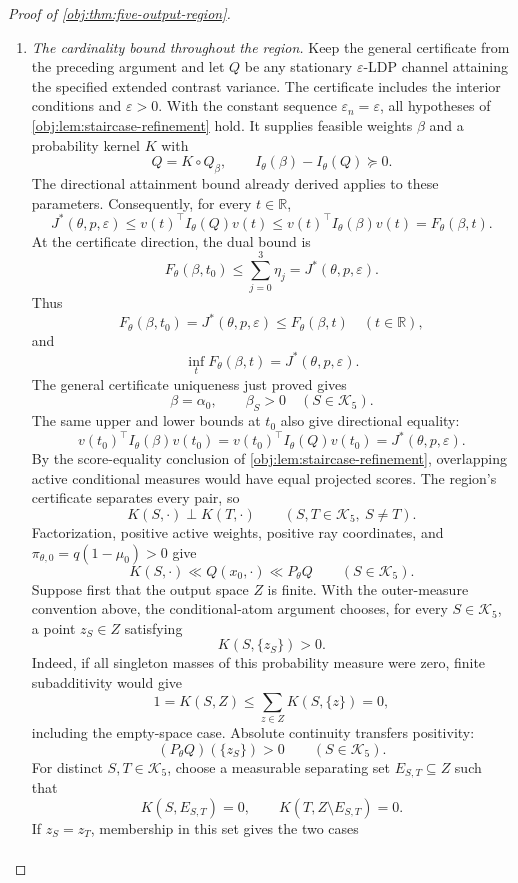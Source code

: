 \begin{proof}[Proof of \cref{obj:thm:five-output-region}]
\begin{enumerate}
\item \textit{The cardinality bound throughout the region.}
Keep the general certificate from the preceding argument and let \(Q\)
be any stationary \(\varepsilon\)-LDP channel attaining the specified
extended contrast variance. The certificate includes the interior
conditions and \(\varepsilon>0\). With the constant sequence
\(\varepsilon_n=\varepsilon\), all hypotheses of
\cref{obj:lem:staircase-refinement} hold. It supplies feasible weights
\(\beta\) and a probability kernel \(K\) with
\[
Q=K\circ Q_\beta,
\qquad
I_\theta(\beta)-I_\theta(Q)\succeq0.
\]
The directional attainment bound already derived applies to these
parameters. Consequently, for every \(t\in\mathbb R\),
\[
J^*(\theta,p,\varepsilon)
\le v(t)^\top I_\theta(Q)v(t)
\le v(t)^\top I_\theta(\beta)v(t)
=F_\theta(\beta,t).
\]
At the certificate direction, the dual bound is
\[
F_\theta(\beta,t_0)\le
\sum_{j=0}^3\eta_j
=
J^*(\theta,p,\varepsilon).
\]
Thus
\[
F_\theta(\beta,t_0)=J^*(\theta,p,\varepsilon)
\le F_\theta(\beta,t)\quad(t\in\mathbb R),
\]
and
\[
\inf_tF_\theta(\beta,t)=J^*(\theta,p,\varepsilon).
\]
The general certificate uniqueness just proved gives
\[
\beta=\alpha_0,\qquad \beta_S>0\quad(S\in\mathcal K_5).
\]
The same upper and lower bounds at \(t_0\) also give directional equality:
\[
v(t_0)^\top I_\theta(\beta)v(t_0)
=
v(t_0)^\top I_\theta(Q)v(t_0)
=
J^*(\theta,p,\varepsilon).
\]
By the score-equality conclusion of
\cref{obj:lem:staircase-refinement}, overlapping active conditional
measures would have equal projected scores. The region's certificate
separates every pair, so
\[
K(S,\cdot)\perp K(T,\cdot)
\qquad(S,T\in\mathcal K_5,\ S\ne T).
\]
Factorization, positive active weights, positive ray coordinates, and
\(\pi_{\theta,0}=q(1-\mu_0)>0\) give
\[
K(S,\cdot)\ll Q(x_0,\cdot)\ll P_\theta Q
\qquad(S\in\mathcal K_5).
\]
Suppose first that the output space \(Z\) is finite. With the outer-measure
convention above, the conditional-atom argument chooses, for every
\(S\in\mathcal K_5\), a point
\(z_S\in Z\) satisfying
\[
K(S,\{z_S\})>0.
\]
Indeed, if all singleton masses of this probability measure were zero,
finite subadditivity would give
\[
1=K(S,Z)\le\sum_{z\in Z}K(S,\{z\})=0,
\]
including the empty-space case. Absolute continuity transfers positivity:
\[
(P_\theta Q)(\{z_S\})>0\qquad(S\in\mathcal K_5).
\]
For distinct \(S,T\in\mathcal K_5\), choose a measurable separating set
\(E_{S,T}\subseteq Z\) such that
\[
K(S,E_{S,T})=0,\qquad K(T,Z\setminus E_{S,T})=0.
\]
If \(z_S=z_T\), membership in this set gives the two cases
\[
\begin{aligned}

\end{aligned}\]
\end{enumerate}
\end{proof}
